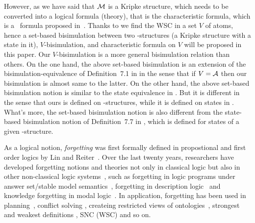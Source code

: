\documentclass{article}
\begin{document}
However, as we have said that ${\cal M}$ is a Kripke structure, which needs to be converted into a logical formula (theory), that is the characteristic formula, which is a \CTL\ formula proposed in~\cite{DBLP:journals/tcs/BrowneCG88}.
Thanks to we find the WSC in a set $V$ of atoms, hence a set-based bisimulation between two \MPK-structures (a Kripke structure with a state in it), $V$-bisimulation, and characteristic formula on $V$ will be proposed in this paper.
Our $V$-bisimulation is a more general bisimulation relation than others.
On the one hand, the above set-based bisimulation is an extension of the
bisimulation-equivalence of Definition~7.1 in \cite{Baier:PMC:2008} in the
sense that if $V=\cal A$ then our bisimulation is almost same to the
latter.
On the other hand, the above set-based bisimulation notion is similar to
the state equivalence in \cite{DBLP:journals/tcs/BrowneCG88}. But it is
different in the sense that ours is defined on \MPK-structures,
while it is defined on states in \cite{DBLP:journals/tcs/BrowneCG88}.
What's more, the set-based bisimulation notion is also different
from  the state-based bisimulation notion of Definition~7.7 in \cite{Baier:PMC:2008},
which is defined for states of a given \MPK-structure.




As a logical notion, \emph{forgetting} was first formally defined
in propostional and first order logics by Lin and Reiter~\cite{lin1994forget}.
Over the last twenty years, researchers have developed forgetting notions and theories not only in classical logic but also in other non-classical logic systems~\cite{eiter2019brief}, such as forgetting in logic programs under answer set/stable model semantics~\cite{DBLP:Zhang:AIJ2006,Eiter2008Semantic,Wong:PhD:Thesis,Yisong:KR:2012,Yisong:IJCAI:2013}, forgetting in description logic~\cite{Wang:AMAI:2010,Lutz:IJCAI:2011,zhao2017role} and knowledge forgetting in modal logic~\cite{Yan:AIJ:2009,Kaile:JAIR:2009,Yongmei:IJCAI:2011,fang2019forgetting}. In application, forgetting has been used in planning~\cite{lin2003compiling},  conflict solving \cite{Lang2010Reasoning,Zhang2005Solving},
createing restricted views of ontologies~\cite{zhao2017role},
strongest and weakest definitions \cite{Lang2008On}, SNC (WSC) \cite{DBLP:journals/ai/Lin01} and so on.
\end{document}
